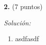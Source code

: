 \textbf{2.} (7 puntos)

\vspace{20px}
\textit{Solución:}
\\

\begin{enumerate}
[label=(\alph*)]
    \item  asdfasdf
\end{enumerate}

